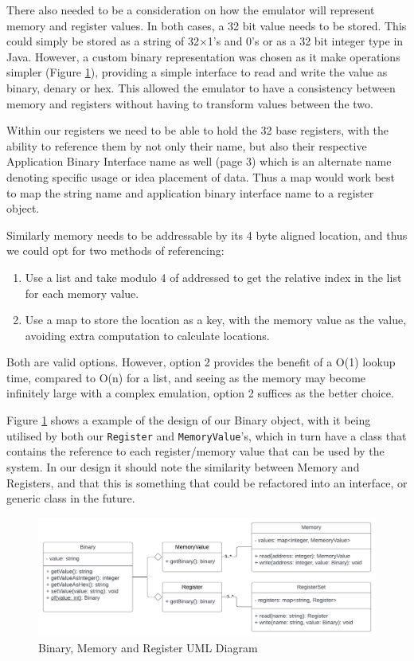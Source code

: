 There also needed to be a consideration on how the emulator will represent memory and register values. In both cases, a 32 bit value needs to be stored. This could simply be stored as a string of 32$\times$1's and 0's or as a 32 bit integer type in Java. However, a custom binary representation was chosen as it make operations simpler (Figure \ref{fig:bin_regmem_uml}), providing a simple interface to read and write the value as binary, denary or hex. This allowed the emulator to have a consistency between memory and registers without having to transform values between the two.

Within our registers we need to be able to hold the 32 base registers, with the ability to reference them by not only their name, but also their respective Application Binary Interface name as well \cite{riscvinternational_2014_calling}(page 3) which is an alternate name denoting specific usage or idea placement of data. Thus a map would work best to map the string name and application binary interface name to a register object.

Similarly memory needs to be addressable by its 4 byte aligned location, and thus we could opt for two methods of referencing:
\begin{enumerate}
    \item Use a list and take modulo 4 of addressed to get the relative index in the list for each memory value.
    \item Use a map to store the location as a key, with the memory value as the value, avoiding extra computation to calculate locations.
\end{enumerate}
Both are valid options. However, option 2 provides the benefit of a O(1) lookup time, compared to O(n) for a list, and seeing as the memory may become infinitely large with a complex emulation, option 2 suffices as the better choice.

Figure \ref{fig:bin_regmem_uml} shows a example of the design of our Binary object, with it being utilised by both our \texttt{Register} and \texttt{MemoryValue}'s, which in turn have a class that contains the reference to each register/memory value that can be used by the system. In our design it should note the similarity between Memory and Registers, and that this is something that could be refactored into an interface, or generic class in the future.

\begin{figure}[H]
    \centering
    \includegraphics[width=\linewidth]{dissertation/DATA/bin_regmem_uml.png}
    \caption{Binary, Memory and Register UML Diagram}
    \label{fig:bin_regmem_uml}
\end{figure}

